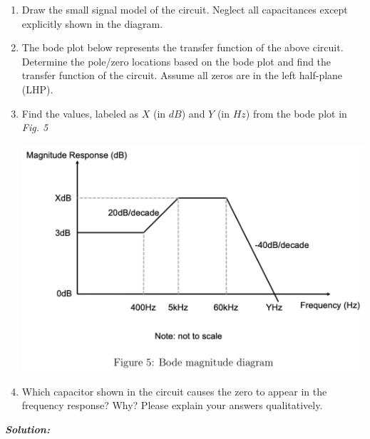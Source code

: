 \documentclass[12pt, fleqn]{article}
\begin{document}
\begin{enumerate}[label=(\alph*)]
    \item
    {
    Draw the small signal model of the circuit. Neglect all capacitances except explicitly shown in the diagram.
    }
    \item
    {
    The bode plot below represents the transfer function of the above circuit. Determine the pole/zero locations based on the bode plot and find the transfer function of the circuit. Assume all zeros are in the left half-plane (LHP).
    }
    \item
    {
    Find the values, labeled as $X$ (in $dB$) and $Y$ (in $Hz$) from the bode plot in \textit{Fig. 5}
    
    \includegraphics[scale=0.3, center]{p2f5.PNG}\\
    }
    \item
    {
    Which capacitor shown in the circuit causes the zero to appear in the frequency response? Why? Please explain your answers qualitatively.
    }
\end{enumerate}
\newpage
\noindent
\textbf{\emph{Solution: }}
\end{document}
